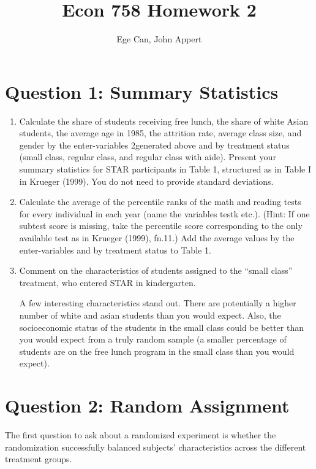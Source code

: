 \documentclass{article}
\begin{document}
\title{Econ 758 Homework 2}
\author{Ege Can, John Appert}
\maketitle

\section{Question 1:  Summary Statistics}

\begin{enumerate}[label=\alph*]
\item Calculate the share of students receiving free lunch, the share of white Asian students, the average age in 1985, the attrition rate, average class size, and gender by the enter-variables 2generated above and by treatment status (small class, regular class, and regular class with aide). Present your summary statistics for STAR participants in Table 1, structured as in Table I in Krueger (1999). You do not need to provide standard deviations.



\item  Calculate the average of the percentile ranks of the math and reading tests for every individual in each year (name the variables testk etc.). (Hint: If one subtest score is missing, take the percentile score corresponding to the only available test as in Krueger (1999), fn.11.) Add the average values by the enter-variables and by treatment status to Table 1.

\item  Comment on the characteristics of students assigned to the “small class” treatment, who entered STAR in kindergarten.

A few interesting characteristics stand out.  There are potentially a higher number of white and asian students than you would expect.  Also, the socioeconomic status of the students in the small class could be better than you would expect from a truly random sample (a smaller percentage of students are on the free lunch program in the small class than you would expect).

\end{enumerate}

\section{Question 2:  Random Assignment}

The first question to ask about a randomized experiment is whether the randomization successfully balanced subjects’ characteristics across the different treatment groups.
\end{document}
